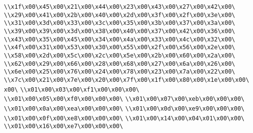 \verb|\\x1f\x00\x45\x00\x21\x00\x44\x00\x23\x00\x43\x00\x27\x00\x42\x00\|\newline
\verb|\\x29\x00\x41\x00\x2b\x00\x40\x00\x2d\x00\x3f\x00\x2f\x00\x3e\x00\|\newline
\verb|\\x31\x00\x3d\x00\x33\x00\x3c\x00\x35\x00\x3b\x00\x37\x00\x3a\x00\|\newline
\verb|\\x39\x00\x39\x00\x3d\x00\x38\x00\x40\x00\x37\x00\x42\x00\x36\x00\|\newline
\verb|\\x43\x00\x35\x00\x45\x00\x34\x00\x4a\x00\x33\x00\x4c\x00\x32\x00\|\newline
\verb|\\x4f\x00\x31\x00\x53\x00\x30\x00\x55\x00\x2f\x00\x56\x00\x2e\x00\|\newline
\verb|\\x58\x00\x2d\x00\x5c\x00\x2c\x00\x5e\x00\x2b\x00\x60\x00\x2a\x00\|\newline
\verb|\\x62\x00\x29\x00\x66\x00\x28\x00\x68\x00\x27\x00\x6a\x00\x26\x00\|\newline
\verb|\\x6e\x00\x25\x00\x76\x00\x24\x00\x78\x00\x23\x00\x7a\x00\x22\x00\|\newline
\verb|\\x7c\x00\x21\x00\x7e\x00\x20\x00\x7f\x00\x1f\x00\x80\x00\x1e\x00\x00\x00\|\newline
\verb|\\x01\x00\x03\x00\xf1\x00\x00\x00\|\newline
\verb|\\x01\x00\x05\x00\xf0\x00\x00\x00\|\newline
\verb|\\x01\x00\x07\x00\xeb\x00\x00\x00\|\newline
\verb|\\x01\x00\x0a\x00\xea\x00\x00\x00\|\newline
\verb|\\x01\x00\x0d\x00\xe9\x00\x00\x00\|\newline
\verb|\\x01\x00\x0f\x00\xe8\x00\x00\x00\|\newline
\verb|\\x01\x00\x14\x00\x04\x01\x00\x00\|\newline
\verb|\\x01\x00\x16\x00\xe7\x00\x00\x00\|\newline
